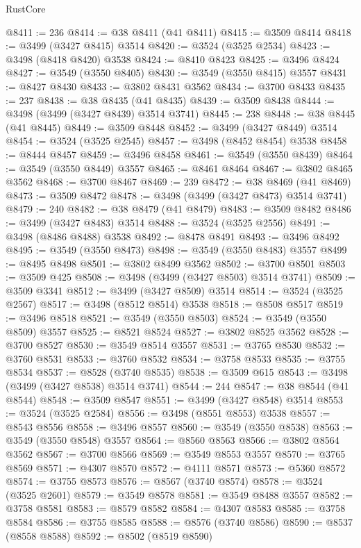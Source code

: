 \begin{lexlean}{RustCore}
\begin{coremodule}
@8411 := 236
@8414 := @38 @8411 (@41 @8411)
@8415 := @3509 @8414
@8418 := @3499 (@3427 @8415) @3514
@8420 := @3524 (@3525 @2534)
@8423 := @3498 (@8418 @8420) @3538
@8424 := @8410 @8423
@8425 := @3496 @8424
@8427 := @3549 (@3550 @8405)
@8430 := @3549 (@3550 @8415) @3557
@8431 := @8427 @8430
@8433 := @3802 @8431 @3562
@8434 := @3700 @8433
@8435 := 237
@8438 := @38 @8435 (@41 @8435)
@8439 := @3509 @8438
@8444 := @3498 (@3499 (@3427 @8439) @3514 @3741)
@8445 := 238
@8448 := @38 @8445 (@41 @8445)
@8449 := @3509 @8448
@8452 := @3499 (@3427 @8449) @3514
@8454 := @3524 (@3525 @2545)
@8457 := @3498 (@8452 @8454) @3538
@8458 := @8444 @8457
@8459 := @3496 @8458
@8461 := @3549 (@3550 @8439)
@8464 := @3549 (@3550 @8449) @3557
@8465 := @8461 @8464
@8467 := @3802 @8465 @3562
@8468 := @3700 @8467
@8469 := 239
@8472 := @38 @8469 (@41 @8469)
@8473 := @3509 @8472
@8478 := @3498 (@3499 (@3427 @8473) @3514 @3741)
@8479 := 240
@8482 := @38 @8479 (@41 @8479)
@8483 := @3509 @8482
@8486 := @3499 (@3427 @8483) @3514
@8488 := @3524 (@3525 @2556)
@8491 := @3498 (@8486 @8488) @3538
@8492 := @8478 @8491
@8493 := @3496 @8492
@8495 := @3549 (@3550 @8473)
@8498 := @3549 (@3550 @8483) @3557
@8499 := @8495 @8498
@8501 := @3802 @8499 @3562
@8502 := @3700 @8501
@8503 := @3509 @425
@8508 := @3498 (@3499 (@3427 @8503) @3514 @3741)
@8509 := @3509 @3341
@8512 := @3499 (@3427 @8509) @3514
@8514 := @3524 (@3525 @2567)
@8517 := @3498 (@8512 @8514) @3538
@8518 := @8508 @8517
@8519 := @3496 @8518
@8521 := @3549 (@3550 @8503)
@8524 := @3549 (@3550 @8509) @3557
@8525 := @8521 @8524
@8527 := @3802 @8525 @3562
@8528 := @3700 @8527
@8530 := @3549 @8514 @3557
@8531 := @3765 @8530
@8532 := @3760 @8531
@8533 := @3760 @8532
@8534 := @3758 @8533
@8535 := @3755 @8534
@8537 := @8528 (@3740 @8535)
@8538 := @3509 @615
@8543 := @3498 (@3499 (@3427 @8538) @3514 @3741)
@8544 := 244
@8547 := @38 @8544 (@41 @8544)
@8548 := @3509 @8547
@8551 := @3499 (@3427 @8548) @3514
@8553 := @3524 (@3525 @2584)
@8556 := @3498 (@8551 @8553) @3538
@8557 := @8543 @8556
@8558 := @3496 @8557
@8560 := @3549 (@3550 @8538)
@8563 := @3549 (@3550 @8548) @3557
@8564 := @8560 @8563
@8566 := @3802 @8564 @3562
@8567 := @3700 @8566
@8569 := @3549 @8553 @3557
@8570 := @3765 @8569
@8571 := @4307 @8570
@8572 := @4111 @8571
@8573 := @5360 @8572
@8574 := @3755 @8573
@8576 := @8567 (@3740 @8574)
@8578 := @3524 (@3525 @2601)
@8579 := @3549 @8578
@8581 := @3549 @8488 @3557
@8582 := @3758 @8581
@8583 := @8579 @8582
@8584 := @4307 @8583
@8585 := @3758 @8584
@8586 := @3755 @8585
@8588 := @8576 (@3740 @8586)
@8590 := @8537 (@8558 @8588)
@8592 := @8502 (@8519 @8590)

\end{coremodule}
\end{lexlean}
